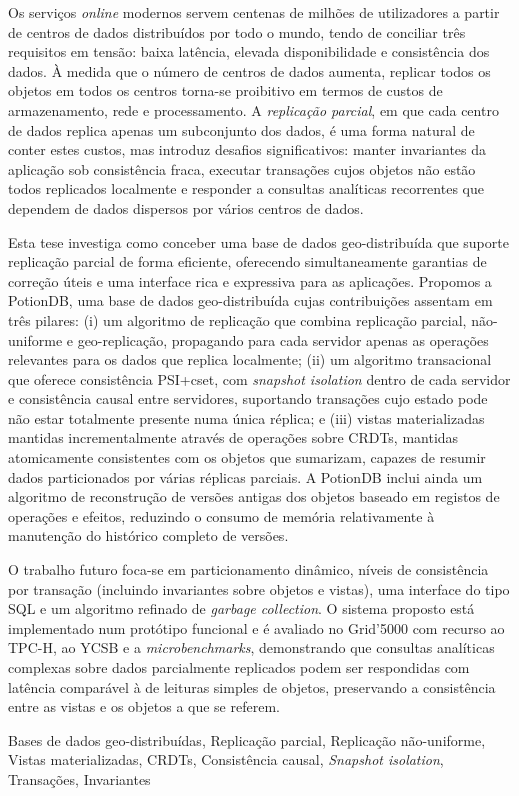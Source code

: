 
%

Os serviços \emph{online} modernos servem centenas de milhões de
utilizadores a partir de centros de dados distribuídos por todo o mundo,
tendo de conciliar três requisitos em tensão: baixa latência, elevada
disponibilidade e consistência dos dados. À medida que o número de centros
de dados aumenta, replicar todos os objetos em todos os centros torna-se
proibitivo em termos de custos de armazenamento, rede e processamento. A
\emph{replicação parcial}, em que cada centro de dados replica apenas um
subconjunto dos dados, é uma forma natural de conter estes custos, mas
introduz desafios significativos: manter invariantes da aplicação sob
consistência fraca, executar transações cujos objetos não estão todos
replicados localmente e responder a consultas analíticas recorrentes
que dependem de dados dispersos por vários centros de dados.

Esta tese investiga como conceber uma base de dados geo-distribuída que
suporte replicação parcial de forma eficiente, oferecendo simultaneamente
garantias de correção úteis e uma interface rica e expressiva para as
aplicações. Propomos a PotionDB, uma base de dados geo-distribuída cujas
contribuições assentam em três pilares: (i) um algoritmo de replicação
que combina replicação parcial, não-uniforme e geo-replicação, propagando
para cada servidor apenas as operações relevantes para os dados que
replica localmente; (ii) um algoritmo transacional que oferece consistência
PSI+cset, com \emph{snapshot isolation} dentro de cada servidor e
consistência causal entre servidores, suportando transações cujo estado
pode não estar totalmente presente numa única réplica; e (iii) vistas
materializadas mantidas incrementalmente através de operações sobre CRDTs,
mantidas atomicamente consistentes com os objetos que sumarizam, capazes
de resumir dados particionados por várias réplicas parciais. A PotionDB
inclui ainda um algoritmo de reconstrução de versões antigas dos objetos
baseado em registos de operações e efeitos, reduzindo o consumo de memória
relativamente à manutenção do histórico completo de versões.

O trabalho futuro foca-se em particionamento dinâmico, níveis de
consistência por transação (incluindo invariantes sobre objetos e vistas),
uma interface do tipo SQL e um algoritmo refinado de \emph{garbage
collection}. O sistema proposto está implementado num protótipo
funcional e é avaliado no Grid'5000 com recurso ao TPC-H, ao YCSB e a
\emph{microbenchmarks}, demonstrando que consultas analíticas complexas
sobre dados parcialmente replicados podem ser respondidas com latência
comparável à de leituras simples de objetos, preservando a consistência
entre as vistas e os objetos a que se referem.

\begin{keywords}
Bases de dados geo-distribuídas, Replicação parcial, Replicação
não-uniforme, Vistas materializadas, CRDTs, Consistência causal,
\emph{Snapshot isolation}, Transações, Invariantes
\end{keywords}
